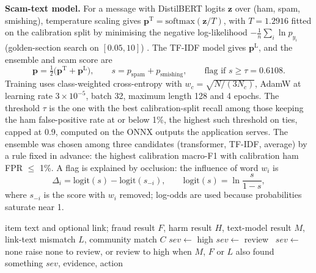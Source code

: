 \noindent\textbf{Scam-text model.} For a message with DistilBERT logits $\mathbf{z}$ over (ham, spam, smishing), temperature scaling gives $\mathbf{p}^{\mathrm{T}}=\mathrm{softmax}(\mathbf{z}/T)$, with $T=1.2916$ fitted on the calibration split by minimising the negative log-likelihood $-\frac1n\sum_i\ln p_{y_i}$ (golden-section search on $[0.05,10]$) \cite{guo}. The TF-IDF model gives $\mathbf{p}^{\mathrm{L}}$, and the ensemble and scam score are
\begin{equation}
\mathbf{p}=\tfrac12\big(\mathbf{p}^{\mathrm{T}}+\mathbf{p}^{\mathrm{L}}\big),\qquad s = p_{\mathrm{spam}}+p_{\mathrm{smishing}},\qquad \text{flag if } s\ge\tau=0.6108 .
\end{equation}
Training uses class-weighted cross-entropy with $w_c=\sqrt{N/(3N_c)}$, AdamW at learning rate $3\times10^{-5}$, batch 32, maximum length 128 and 4 epochs. The threshold $\tau$ is the one with the best calibration-split recall among those keeping the ham false-positive rate at or below 1\%, the highest such threshold on ties, capped at 0.9, computed on the ONNX outputs the application serves. The ensemble was chosen among three candidates (transformer, TF-IDF, average) by a rule fixed in advance: the highest calibration macro-F1 with calibration ham FPR $\le$ 1\%. A flag is explained by occlusion: the influence of word $w_i$ is
\begin{equation}
\Delta_i=\mathrm{logit}(s)-\mathrm{logit}(s_{-i}),\qquad \mathrm{logit}(s)=\ln\frac{s}{1-s},
\end{equation}
where $s_{-i}$ is the score with $w_i$ removed; log-odds are used because probabilities saturate near 1.

\begin{algorithm}[!htbp]
\caption{Auto-scan severity for one page item}\label{alg:scan}
\begin{algorithmic}[1]
\Require item text and optional link; fraud result $F$, harm result $H$, text-model result $M$, link-text mismatch $L$, community match $C$
 $sev\gets$ high
 $sev\gets$ review
\Else\ $sev\gets$ none 
\EndIf
{} raise none to review, or review to high when $M$, $F$ or $L$ also found something \EndIf
\State \Return $sev$, evidence, action
\end{algorithmic}
\end{algorithm}

